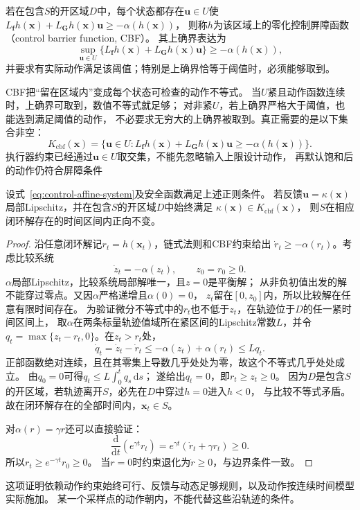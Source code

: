 \begin{definition}[零化控制屏障函数]
\label{def:control-cbf}
若在包含$S$的开区域$D$中，每个状态都存在$\bm u\in U$使
$L_{\bm f}h(\bm x)+L_{\bm G}h(\bm x)\bm u\geq-\alpha(h(\bm x))$，
则称$h$为该区域上的零化控制屏障函数（control barrier function, CBF）。
其上确界表达为
\begin{equation}
  \sup_{\bm u\in U}
  \{L_{\bm f}h(\bm x)+L_{\bm G}h(\bm x)\bm u\}
  \geq-\alpha(h(\bm x)),
  \label{eq:control-cbf-existence}
\end{equation}
并要求有实际动作满足该阈值；特别是上确界恰等于阈值时，必须能够取到。
\end{definition}
CBF把“留在区域内”变成每个状态可检查的动作不等式。
当$U$紧且动作函数连续时，上确界可取到，数值不等式就足够；
对非紧$U$，若上确界严格大于阈值，也能选到满足阈值的动作，
不必要求无穷大的上确界被取到。真正需要的是以下集合非空：
\begin{equation}
  K_{\mathrm{cbf}}(\bm x)=
  \{\bm u\in U:L_{\bm f}h(\bm x)+L_{\bm G}h(\bm x)\bm u
                      \geq-\alpha(h(\bm x))\}.
  \label{eq:control-cbf-action-set}
\end{equation}
执行器约束已经通过$\bm u\in U$取交集，不能先忽略输入上限设计动作，
再默认饱和后的动作仍符合屏障条件

\begin{theorem}[CBF条件保证正向不变]
\label{thm:control-cbf-invariance}
设式~\eqref{eq:control-affine-system}及安全函数满足上述正则条件。
若反馈$\bm u=\kappa(\bm x)$局部Lipschitz，并在包含$S$的开区域$D$中始终满足
$\kappa(\bm x)\in K_{\mathrm{cbf}}(\bm x)$，
则$S$在相应闭环解存在的时间区间内正向不变。
\end{theorem}
\begin{proof}
沿任意闭环解记$r_t=h(\bm x_t)$，链式法则和CBF约束给出
$\dot r_t\geq-\alpha(r_t)$。考虑比较系统
\[
  \dot z_t=-\alpha(z_t),\qquad z_0=r_0\geq0.
\]
$\alpha$局部Lipschitz，比较系统局部解唯一，且$z=0$是平衡解；
从非负初值出发的解不能穿过零点。又因$\alpha$严格递增且$\alpha(0)=0$，
$z_t$留在$[0,z_0]$内，所以比较解在任意有限时间存在。
为验证微分不等式中的$r_t$也不低于$z_t$，在轨迹位于$D$的任一紧时间区间上，
取$\alpha$在两条标量轨迹值域所在紧区间的Lipschitz常数$L$，并令
$q_t=\max\{z_t-r_t,0\}$。在$z_t>r_t$处，
\[
 \dot q_t=\dot z_t-\dot r_t
 \leq-\alpha(z_t)+\alpha(r_t)\leq Lq_t.
\]
正部函数绝对连续，且在其零集上导数几乎处处为零，故这个不等式几乎处处成立。
由$q_0=0$可得$q_t\leq L\int_0^tq_s\,\mathrm ds$；
遂给出$q_t=0$，即$r_t\geq z_t\geq0$。
因为$D$是包含$S$的开区域，若轨迹离开$S$，必先在$D$中穿过$h=0$进入$h<0$，
与比较不等式矛盾。故在闭环解存在的全部时间内，$\bm x_t\in S$。

对$\alpha(r)=\gamma r$还可以直接验证：
\[
  \frac{\mathrm d}{\mathrm dt}(e^{\gamma t}r_t)
  =e^{\gamma t}(\dot r_t+\gamma r_t)\geq0.
\]
所以$r_t\geq e^{-\gamma t}r_0\geq0$。
当$r=0$时约束退化为$\dot r\geq0$，与边界条件一致。
\end{proof}
这项证明依赖动作约束始终可行、反馈与动态足够规则，以及动作按连续时间模型实际施加。
某一个采样点的动作朝内，不能代替这些沿轨迹的条件。

